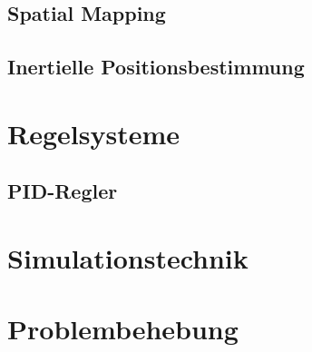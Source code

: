    \subsection{Spatial Mapping}

    \subsection{Inertielle Positionsbestimmung}

\section{Regelsysteme}

    \subsection{PID-Regler}

\section{Simulationstechnik}

\section{Problembehebung}
